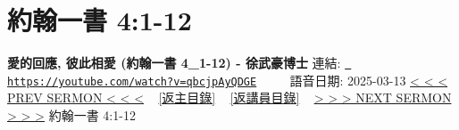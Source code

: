 \documentclass{book}
\begin{document}
\section{約翰一書 4:1-12}
\label{sec:qbcjpAyQDGE}
\textbf{愛的回應, 彼此相愛 (約翰一書 4\_1-12) - 徐武豪博士}
\newline
\newline
連結: \href{https://youtube.com/watch?v=qbcjpAyQDGE}{\texttt{ https://youtube.com/watch?v=qbcjpAyQDGE}} ~~~~ 語音日期: 2025-03-13 
\newline
\newline
\hyperref[sec:K8E95o7ZcvU]{< < < PREV SERMON < < <}
~
\hyperlink{toc}{[返主目錄]}
~
\hyperref[ch:preacher4]{[返講員目錄]}
~
\hyperref[sec:cau3XNPSx68]{> > > NEXT SERMON > > >}
\newline
\newline
約翰一書 4:1-12
\newline
\end{document}
